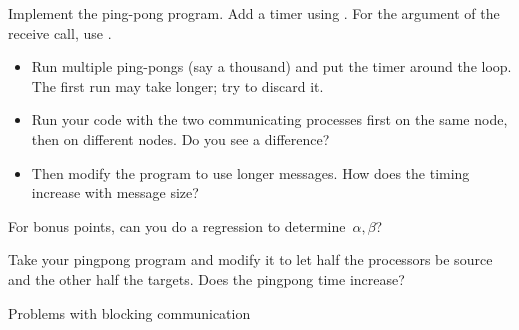 \begin{exercise}
  \label{ex:pingpong}
  Implement the ping-pong program. Add a timer using .
  For the  argument of the receive call, use
  .

  \begin{itemize}
  \item Run multiple ping-pongs (say a thousand) and put the timer
    around the loop. The first run may take longer; try to discard it.
  \item Run your code with the two communicating processes first on
    the same node, then on different nodes. Do you see a difference?
  \item Then modify the program
    to use longer messages. How does the timing increase with message size?
  \end{itemize}
  For bonus points, can you do a regression to determine~$\alpha,\beta$?
\end{exercise}

\begin{exercise}
  \label{ex:hbwpingpong}
  Take your pingpong program and modify it 
  to let half the processors
  be source and the other half the targets. Does the pingpong time increase?
\end{exercise}

 {Problems with blocking communication}
\label{sec:blocking}

